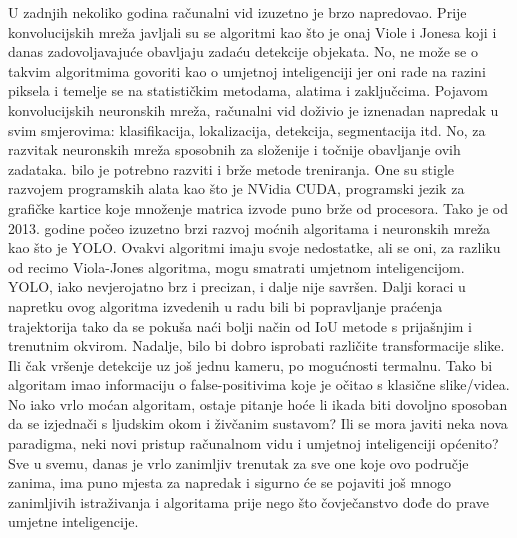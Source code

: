 U zadnjih nekoliko godina računalni vid izuzetno je brzo napredovao. Prije konvolucijskih mreža javljali su se algoritmi kao što je onaj Viole i Jonesa koji i danas zadovoljavajuće obavljaju zadaću detekcije objekata. No, ne može se o takvim algoritmima govoriti kao o umjetnoj inteligenciji jer oni rade na razini piksela i temelje se na statističkim metodama, alatima i zaključcima. Pojavom konvolucijskih neuronskih mreža, računalni vid doživio je iznenadan napredak u svim smjerovima: klasifikacija, lokalizacija, detekcija, segmentacija itd. No, za razvitak neuronskih mreža sposobnih za složenije i točnije obavljanje ovih zadataka. bilo je potrebno razviti i brže metode treniranja. One su stigle razvojem programskih alata kao što je NVidia CUDA, programski jezik za grafičke kartice koje množenje matrica izvode puno brže od procesora. Tako je od 2013. godine počeo izuzetno brzi razvoj moćnih algoritama i neuronskih mreža kao što je YOLO. Ovakvi algoritmi imaju svoje nedostatke, ali se oni, za razliku od recimo Viola-Jones algoritma, mogu smatrati umjetnom inteligencijom. YOLO, iako nevjerojatno brz i precizan, i dalje nije savršen. Dalji koraci u napretku ovog algoritma izvedenih u radu bili bi popravljanje praćenja trajektorija tako da se pokuša naći bolji način od IoU metode s prijašnjim i trenutnim okvirom. Nadalje, bilo bi dobro isprobati različite transformacije slike. Ili čak vršenje detekcije uz još jednu kameru, po mogućnosti termalnu. Tako bi algoritam imao informaciju o false-positivima koje je očitao s klasične slike/videa. No iako vrlo moćan algoritam, ostaje pitanje hoće li ikada biti dovoljno sposoban da se izjednači s ljudskim okom i živčanim sustavom? Ili se mora javiti neka nova paradigma, neki novi pristup računalnom vidu i umjetnoj inteligenciji općenito? Sve u svemu, danas je vrlo zanimljiv trenutak za sve one koje ovo područje zanima, ima puno mjesta za napredak i sigurno će se pojaviti još mnogo zanimljivih istraživanja i algoritama prije nego što čovječanstvo dođe do prave umjetne inteligencije.